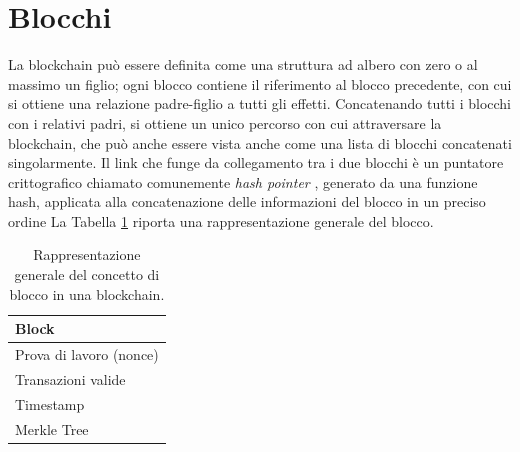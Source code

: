 \section{Blocchi}
\label{sec:blocchiBlockchain}

La blockchain può essere definita come una struttura ad albero con zero o al massimo un figlio; ogni blocco contiene il riferimento al blocco precedente, con cui si ottiene una relazione padre-figlio a tutti gli effetti.
Concatenando tutti i blocchi con i relativi padri, si ottiene un unico percorso con cui attraversare la blockchain, che può anche essere vista anche come una lista di blocchi concatenati singolarmente.
Il link che funge da collegamento tra i due blocchi è un puntatore crittografico chiamato comunemente {\it hash pointer \/}, generato da una funzione hash, applicata alla concatenazione delle informazioni del blocco in un preciso ordine La Tabella \ref{tab:bitcoinblock} riporta una rappresentazione generale del blocco.


\begin{table}[ht]
       \centering\small
           \begin{tabular}{l}
               \toprule
               Block\\
               \midrule
               Prova di lavoro (nonce)   \\
               Transazioni valide \\
               Timestamp \\
               Merkle Tree \\
               \bottomrule
       \end{tabular}
       \caption{Rappresentazione generale del concetto di blocco in una blockchain.\label{tab:bitcoinblock}}
   \end{table}


